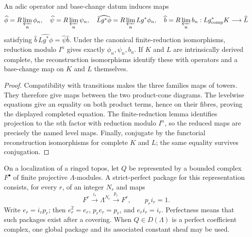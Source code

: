 \begin{lemma}
\label{lemma:weil-pbc-adic-reconstruction-compatibility}
An adic operator and base-change datum induces maps
\[
 \widehat\phi=R\varprojlim_n\phi_n,\quad
 \widehat\psi=R\varprojlim_n\psi_n,\quad
 \widehat{Lg^*\phi}=R\varprojlim_nLg^*\phi_n,\quad
 \widehat b=R\varprojlim_nb_n:
 Lg^*_{\mathrm{comp}}K\longrightarrow\widehat L
\]
satisfying
$\widehat b\,\widehat{Lg^*\phi}
=\widehat\psi\widehat b$.  Under the canonical finite-reduction
isomorphisms, reduction modulo $I^n$ gives exactly
$\phi_n,\psi_n,b_n$.  If $K$ and $L$ are intrinsically derived complete,
the reconstruction isomorphisms identify these with operators and a
base-change map on $K$ and $L$ themselves.
\end{lemma}
\begin{proof}

Compatibility with transitions makes the three families maps of towers.
They therefore give maps between the two product-cone diagrams.  The
levelwise equations give an equality on both product terms, hence on their
fibres, proving the displayed completed equation.  The finite-reduction
lemma identifies projection to the $n$th factor with reduction modulo
$I^n$, so the reduced maps are precisely the named level maps.  Finally,
conjugate by the functorial reconstruction isomorphisms for complete $K$
and $L$; the same equality survives conjugation.
\end{proof}

\begin{definition}
\label{def:weil-pbc-strict-perfect-coefficient-package}
\uses{}
On a localization of a ringed topos, let $Q$ be represented by a bounded
complex $F^\bullet$ of finite projective $\Lambda$-modules.  A strict-perfect
package for this representation consists, for every $r$, of an integer
$N_r$ and maps
\[
 F^r\xrightarrow{i_r}\Lambda^{N_r}
 \xrightarrow{p_r}F^r,\qquad p_ri_r=1.
\]
Write $e_r=i_rp_r$; then $e_r^2=e_r$, $p_re_r=p_r$, and $e_ri_r=i_r$.
Perfectness means that such packages exist after a covering.  When
$Q\in D(\Lambda)$ is a perfect coefficient complex, one global package and
its associated constant sheaf may be used.
\end{definition}

